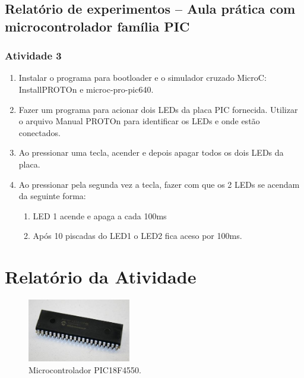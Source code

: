 \documentclass[
	12pt,				%
	openright,			%
  oneside,     %
	a4paper,			%
	english,			%
	french,				%
	spanish,			%
	brazil				%
	]{abntex2}
\begin{document}
\subsection*{Relatório de experimentos – Aula prática com microcontrolador família PIC}

\subsubsection*{Atividade 3}

\begin{enumerate}
  \item Instalar o programa para bootloader e o simulador cruzado MicroC: InstallPROTOn e microc-pro-pic640. 
  \item Fazer um programa para acionar dois LEDs da placa PIC fornecida. Utilizar o arquivo Manual PROTOn para identificar os LEDs e onde estão conectados.
  \item Ao pressionar uma tecla, acender e depois apagar todos os dois LEDs da placa.
  \item Ao pressionar pela segunda vez a tecla, fazer com que os 2 LEDs se acendam da seguinte forma:
  \begin{enumerate}
    \item LED 1 acende e apaga a cada 100ms
    \item Após 10 piscadas do LED1 o LED2 fica aceso por 100ms.
  \end{enumerate}
\end{enumerate}


\section{Relatório da Atividade} %
\label{sec:consideracoes-PIC}

\begin{figure}[ht]
  \centering
  \caption{\label{fig:03MicrocontrollerPIC_18F4550}Microcontrolador PIC18F4550.} 
  \includegraphics[width=0.4\textwidth]{images/Atividade03/03MicrocontrollerPIC_18F4550.jpg}
\end{figure}
\end{document}
